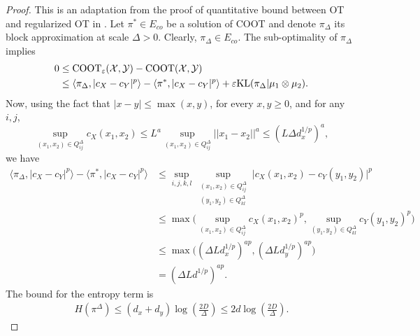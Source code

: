 \begin{proof}
    This is an adaptation from the proof of quantitative bound between OT and regularized OT
    in \citep{Genevay19}.
    Let $\pi^* \in E_{co}$ be a solution of COOT and denote $\pi_{\Delta}$
    its block approximation at scale $\Delta > 0$.
    Clearly, $\pi_{\Delta} \in E_{co}$. The sub-optimality of $\pi_{\Delta}$ implies
    \begin{equation}
      \begin{split}
        0 &\leq \text{COOT}_{\varepsilon}(\mathcal X, \mathcal Y) - \text{COOT}(\mathcal X, \mathcal Y) \\
        &\leq \langle \pi_{\Delta}, \vert c_X - c_Y \vert^p \rangle
        - \langle \pi^*, \vert c_X - c_Y \vert^p \rangle +
        \varepsilon \text{KL}(\pi_{\Delta} \vert \mu_1 \otimes \mu_2).
      \end{split}
    \end{equation}
    Now, using the fact that $\vert x - y \vert \leq \max(x,y)$, for every $x, y \geq 0$,
    and for any $i,j$,
    \begin{equation}
      \sup_{(x_1, x_2) \in Q^{\Delta}_{ij}} c_X(x_1,x_2) \leq
      L^a \sup_{(x_1, x_2) \in Q^{\Delta}_{ij}} \vert\vert x_1 - x_2 \vert\vert^a \leq (L \Delta d_x^{1/p})^a,
    \end{equation}
    we have
    \begin{equation}
      \begin{split}
        \langle \pi_{\Delta}, \vert c_X - c_Y \vert^p \rangle
        - \langle \pi^*, \vert c_X - c_Y \vert^p \rangle
        &\leq \sup_{i,j,k,l} \sup_{\substack{(x_1, x_2) \in Q^{\Delta}_{ij} \\ (y_1,y_2) \in Q^{\Delta}_{kl}}}
        \vert c_X(x_1,x_2) - c_Y(y_1,y_2) \vert^p \\
        &\leq \max\big( \sup_{(x_1, x_2) \in Q^{\Delta}_{ij}} c_X(x_1,x_2)^p,
        \sup_{(y_1, y_2) \in Q^{\Delta}_{kl}} c_Y(y_1,y_2)^p \big) \\
        &\leq \max\big( (\Delta Ld_x^{1/p})^{ap}, (\Delta Ld_y^{1/p})^{ap} \big) \\
        &= (\Delta Ld^{1/p})^{ap}.
      \end{split}
    \end{equation}
    The bound for the entropy term is
    \begin{equation}
      \begin{split}
        H(\pi^{\Delta}) \leq (d_x + d_y) \log(\frac{2D}{\Delta}) \leq 2 d \log(\frac{2D}{\Delta}).
      \end{split}

\end{equation}
\end{proof}
